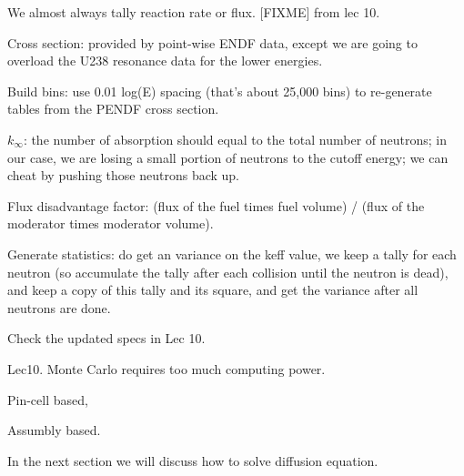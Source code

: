 \documentclass{school-22.211-notes}
\begin{document}
We almost always tally reaction rate or flux. 
[FIXME] from lec 10.



Cross section: provided by point-wise ENDF data, except we are going to overload the U238 resonance data for the lower energies.

Build bins: use 0.01 log(E) spacing (that's about 25,000 bins) to re-generate tables from the PENDF cross section. 

$k_{\infty}$: the number of absorption should equal to the total number of neutrons; in our case, we are losing a small portion of neutrons to the cutoff energy; we can cheat by pushing those neutrons back up. 

Flux disadvantage factor: (flux of the fuel times fuel volume) / (flux of the moderator times moderator volume). 

Generate statistics: do get an variance on the keff value, we keep a tally for each neutron (so accumulate the tally after each collision until the neutron is dead), and keep a copy of this tally and its square, and get the variance after all neutrons are done. 

Check the updated specs in Lec 10. 

Lec10. Monte Carlo requires too much computing power. 


Pin-cell based, 


Assumbly based. 




In the next section we will discuss how to solve diffusion equation. 
\end{document}
